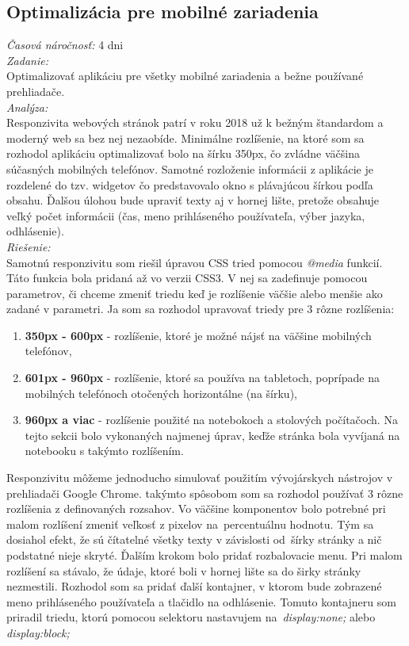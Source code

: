 \documentclass[11pt, oneside]{report}
\begin{document}
\subsection{Optimalizácia pre mobilné zariadenia}
\textit{Časová náročnosť:} 4 dni\\
\textit{Zadanie:}\\
Optimalizovať aplikáciu pre všetky mobilné zariadenia a bežne používané prehliadače.
\\\textit{Analýza:}\\
Responzivita webových stránok patrí v roku 2018 už k bežným štandardom a moderný web sa bez nej nezaobíde. Minimálne rozlíšenie, na ktoré som sa rozhodol aplikáciu optimalizovať  bolo na šírku  350px, čo zvládne väčšina súčasných mobilných telefónov.  Samotné rozloženie  informácii z aplikácie je rozdelené do tzv. widgetov čo predstavovalo okno s plávajúcou šírkou podľa obsahu. Ďalšou úlohou bude upraviť  texty aj v hornej lište, pretože obsahuje veľký počet informácii (čas, meno prihláseného používateľa, výber jazyka, odhlásenie).
\\\textit{Riešenie:}\\
Samotnú responzivitu som riešil  úpravou CSS tried pomocou \textit{@media} funkcií. Táto funkcia bola pridaná až vo verzii CSS3. V nej sa zadefinuje pomocou parametrov, či chceme zmeniť triedu keď je rozlíšenie väčšie alebo menšie ako zadané v parametri. Ja som sa rozhodol upravovať triedy pre 3 rôzne rozlíšenia:
\begin{enumerate}
\item \textbf{350px - 600px} - rozlíšenie, ktoré je možné nájsť na väčšine mobilných telefónov,
\item \textbf{601px - 960px} -  rozlíšenie, ktoré sa používa na tabletoch, poprípade na mobilných telefónoch otočených horizontálne (na šírku),
\item \textbf{960px a viac} -  rozlíšenie použité na notebokoch a stolových počítačoch. Na tejto sekcii bolo vykonaných najmenej úprav, keďže stránka bola vyvíjaná na notebooku s takýmto rozlíšením.
\end{enumerate}
Responzivitu môžeme jednoducho simulovať použitím vývojárskych nástrojov  v prehliadači Google Chrome. takýmto spôsobom som sa rozhodol používať 3 rôzne rozlíšenia z  definovaných rozsahov. Vo väčšine komponentov bolo potrebné pri malom rozlíšení zmeniť veľkosť z pixelov na~percentuálnu hodnotu. Tým sa dosiahol efekt, že  sú čítatelné všetky texty v závislosti od~šírky stránky a nič podstatné nieje skryté. Ďalším krokom bolo  pridať rozbalovacie menu. Pri malom rozlíšení sa stávalo, že údaje, ktoré boli v hornej lište  sa  do širky stránky nezmestili. Rozhodol som sa pridať ďalší kontajner, v ktorom bude zobrazené meno prihláseného používateľa a tlačidlo na odhlásenie. Tomuto kontajneru som priradil triedu, ktorú  pomocou selektoru nastavujem na~\textit{display:none;} alebo \textit{display:block;}
\end{document}
